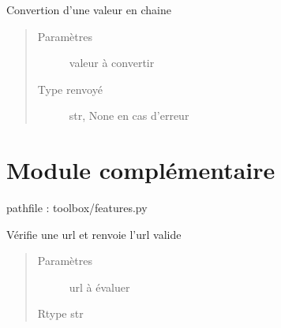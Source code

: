 \documentclass[letterpaper,10pt,french]{sphinxmanual}
\begin{document}

\begin{fulllineitems}
\label{\detokenize{modules/tools:toolbox.tools.string_me}}
Convertion d’une valeur en chaine
\begin{quote}\begin{description}
\item[{Paramètres}] \leavevmode
{} \textendash{} valeur à convertir

\item[{Type renvoyé}] \leavevmode
str, None en cas d’erreur

\end{description}\end{quote}

\end{fulllineitems}

\label{\detokenize{modules/tools:module-toolbox.features}}

\section{Module complémentaire}
\label{\detokenize{modules/tools:module-complementaire}}
pathfile : toolbox/features.py

\begin{fulllineitems}
\label{\detokenize{modules/tools:toolbox.features.test_http_link}}
Vérifie une url et renvoie l’url valide
\begin{quote}\begin{description}
\item[{Paramètres}] \leavevmode
{} \textendash{} url à évaluer

\item[{Rtype str}] \leavevmode
\end{description}\end{quote}

\end{fulllineitems}
\end{document}
